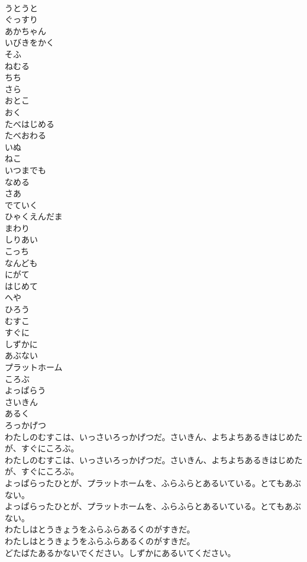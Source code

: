 \documentclass[8pt]{extreport}
\begin{document}
\begin{CJK}{UTF8}{min}
\\	うとうと
\\	ぐっすり
\\	あかちゃん
\\	いびきをかく
\\	そふ
\\	ねむる
\\	ちち
\\	さら
\\	おとこ
\\	おく
\\	たべはじめる
\\	たべおわる
\\	いぬ
\\	ねこ
\\	いつまでも
\\	なめる
\\	さあ
\\	でていく
\\	ひゃくえんだま
\\	まわり
\\	しりあい
\\	こっち
\\	なんども
\\	にがて
\\	はじめて
\\	へや
\\	ひろう
\\	むすこ
\\	すぐに
\\	しずかに
\\	あぶない
\\	プラットホーム
\\	ころぶ
\\	よっぱらう
\\	さいきん
\\	あるく
\\	ろっかげつ
\\	わたしのむすこは、いっさいろっかげつだ。さいきん、よちよちあるきはじめたが、すぐにころぶ。
\\	わたしのむすこは、いっさいろっかげつだ。さいきん、よちよちあるきはじめたが、すぐにころぶ。
\\	よっぱらったひとが、プラットホームを、ふらふらとあるいている。とてもあぶない。
\\	よっぱらったひとが、プラットホームを、ふらふらとあるいている。とてもあぶない。
\\	わたしはとうきょうをふらふらあるくのがすきだ。
\\	わたしはとうきょうをふらふらあるくのがすきだ。
\\	どたばたあるかないでください。しずかにあるいてください。

\end{CJK}
\end{document}
